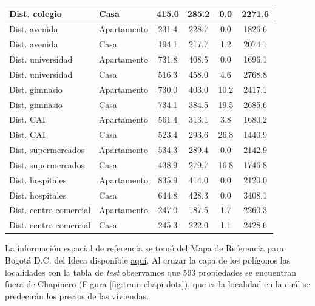 \documentclass[
  11pt,
  letterpaper,
]{article}
\begin{document}
\begin{table}[!h]
\begin{tabular}[t]{l|l|c|c|c|c}
\hline
Dist. colegio & Casa & 415.0 & 285.2 & 0.0 & 2271.6\\
\hline
Dist. avenida & Apartamento & 231.4 & 228.7 & 0.0 & 1826.6\\
\hline
Dist. avenida & Casa & 194.1 & 217.7 & 1.2 & 2074.1\\
\hline
Dist. universidad & Apartamento & 731.8 & 408.5 & 0.0 & 1696.1\\
\hline
Dist. universidad & Casa & 516.3 & 458.0 & 4.6 & 2768.8\\
\hline
Dist. gimnasio & Apartamento & 730.0 & 403.0 & 10.2 & 2417.1\\
\hline
Dist. gimnasio & Casa & 734.1 & 384.5 & 19.5 & 2685.6\\
\hline
Dist. CAI & Apartamento & 561.4 & 313.1 & 3.8 & 1680.2\\
\hline
Dist. CAI & Casa & 523.4 & 293.6 & 26.8 & 1440.9\\
\hline
Dist. supermercados & Apartamento & 534.3 & 289.4 & 0.0 & 2142.9\\
\hline
Dist. supermercados & Casa & 438.9 & 279.7 & 16.8 & 1746.8\\
\hline
Dist. hospitales & Apartamento & 835.9 & 414.0 & 0.0 & 2120.0\\
\hline
Dist. hospitales & Casa & 644.8 & 428.3 & 0.0 & 3408.1\\
\hline
Dist. centro comercial & Apartamento & 247.0 & 187.5 & 1.7 & 2260.3\\
\hline
Dist. centro comercial & Casa & 245.3 & 222.0 & 1.1 & 2428.6\\
\hline
\end{tabular}
\end{table}

La información espacial de referencia se tomó del Mapa de Referencia para Bogotá D.C. del Ideca disponible \href{https://www.ideca.gov.co/recursos/mapas/mapa-de-referencia-para-bogota-dc}{aquí}. Al cruzar la capa de los polígonos las localidades con la tabla de \emph{test} observamos que 593 propiedades se encuentran fuera de Chapinero (Figura \ref{fig:train-chapi-dots}), que es la localidad en la cuál se predecirán los precios de las viviendas.
\end{document}
